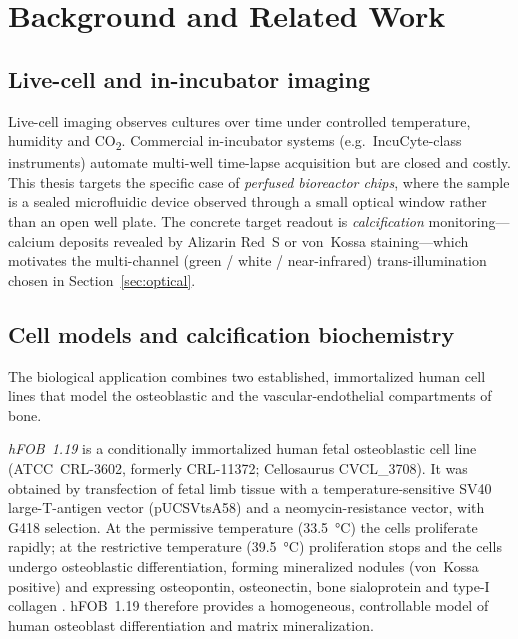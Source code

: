 \section{Background and Related Work}
\label{sec:background}

\subsection{Live-cell and in-incubator imaging}
Live-cell imaging observes cultures over time under controlled temperature,
humidity and CO\textsubscript{2}. Commercial in-incubator systems (e.g.\ IncuCyte-class
instruments) automate multi-well time-lapse acquisition but are closed and
costly. This thesis targets the specific case of \emph{perfused bioreactor
chips}, where the sample is a sealed microfluidic device observed through a
small optical window rather than an open well plate. The concrete target
readout is \emph{calcification} monitoring---calcium deposits revealed by
Alizarin Red~S or von~Kossa staining---which motivates the multi-channel
(green / white / near-infrared) trans-illumination chosen in
Section~\ref{sec:optical}.

\subsection{Cell models and calcification biochemistry}
\label{sec:biology}
The biological application combines two established, immortalized human cell
lines that model the osteoblastic and the vascular-endothelial compartments of
bone.

\emph{hFOB~1.19} is a conditionally immortalized human fetal osteoblastic cell
line \cite{Harris1995hFOB} (ATCC~CRL-3602, formerly CRL-11372; Cellosaurus
CVCL\_3708). It was obtained by transfection of fetal limb tissue with a
temperature-sensitive SV40 large-T-antigen vector (pUCSVtsA58) and a
neomycin-resistance vector, with G418 selection. At the permissive temperature
(\SI{33.5}{\celsius}) the cells proliferate rapidly; at the restrictive
temperature (\SI{39.5}{\celsius}) proliferation stops and the cells undergo
osteoblastic differentiation, forming mineralized nodules (von~Kossa positive)
and expressing osteopontin, osteonectin, bone sialoprotein and type-I collagen
\cite{Harris1995hFOB}. hFOB~1.19 therefore provides a homogeneous, controllable
model of human osteoblast differentiation and matrix mineralization.

